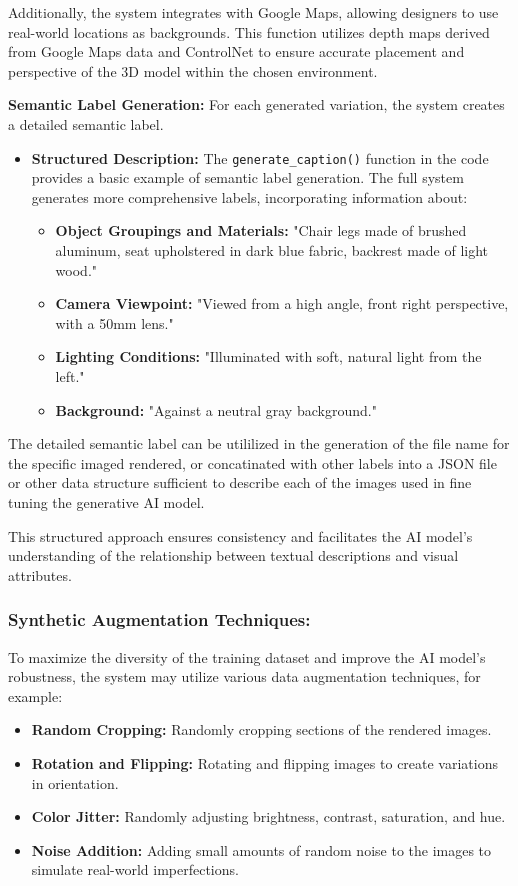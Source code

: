 \documentclass{article}
\begin{document}
Additionally, the system integrates with Google Maps, allowing designers to use real-world locations as backgrounds. This function utilizes depth maps derived from Google Maps data and ControlNet to ensure accurate placement and perspective of the 3D model within the chosen environment. 

\textbf{Semantic Label Generation:} For each generated variation, the system creates a detailed semantic label.

\begin{itemize}
    \item \textbf{Structured Description:} The \texttt{generate\_caption()} function in the code provides a basic example of semantic label generation. The full system generates more comprehensive labels, incorporating information about:
    \begin{itemize}
        \item \textbf{Object Groupings and Materials:} "Chair legs made of brushed aluminum, seat upholstered in dark blue fabric, backrest made of light wood."
        \item \textbf{Camera Viewpoint:} "Viewed from a high angle, front right perspective, with a 50mm lens."
        \item \textbf{Lighting Conditions:} "Illuminated with soft, natural light from the left."
        \item \textbf{Background:} "Against a neutral gray background."
    \end{itemize}
\end{itemize}

The detailed semantic label can be utililized in the generation of the file name for the specific imaged rendered, or concatinated with other labels into a JSON file or other data structure sufficient to describe each of the images used in fine tuning the generative AI model. 

This structured approach ensures consistency and facilitates the AI model's understanding of the relationship between textual descriptions and visual attributes.

\subsubsection{Synthetic Augmentation Techniques:} To maximize the diversity of the training dataset and improve the AI model's robustness, the system may utilize various data augmentation techniques, for example:

\begin{itemize}
    \item \textbf{Random Cropping:} Randomly cropping sections of the rendered images.
    \item \textbf{Rotation and Flipping:} Rotating and flipping images to create variations in orientation.
    \item \textbf{Color Jitter:} Randomly adjusting brightness, contrast, saturation, and hue.
    \item \textbf{Noise Addition:} Adding small amounts of random noise to the images to simulate real-world imperfections.
\end{itemize}
\end{document}
